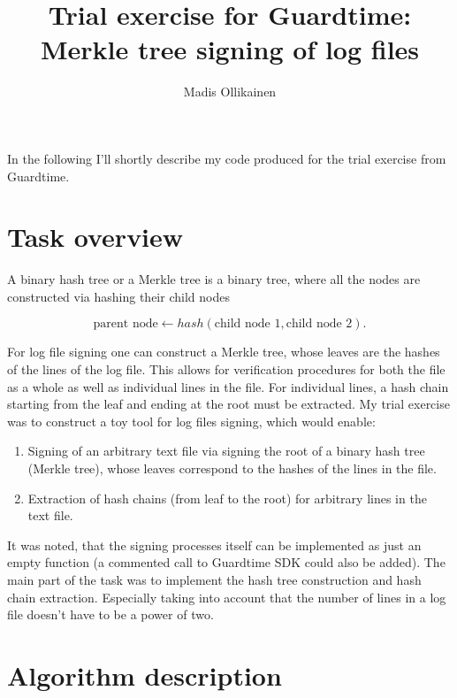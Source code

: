 \documentclass[11pt]{article}
\author{Madis Ollikainen}
\title{Trial exercise for Guardtime: Merkle tree signing of log files}
\begin{document}
\maketitle

In the following I'll shortly describe my code produced for the trial exercise from Guardtime. 

\section{Task overview} %
\label{sec:task_overview}


A binary hash tree or a Merkle tree is a binary tree, where all the nodes are constructed via hashing their child nodes

\begin{equation}
 \text{parent node} \leftarrow hash( \text{child node 1}, \text{child node 2} ). 	
\end{equation} 

For log file signing one can construct a Merkle tree, whose leaves are the hashes of the lines of the log file. This allows for verification procedures for both the file as a whole as well as individual lines in the file. For individual lines, a hash chain starting from the leaf and ending at the root must be extracted. My trial exercise was to construct a toy tool for log files signing, which would enable:  

\begin{enumerate}
  	\item Signing of an arbitrary text file via signing the root of a binary hash tree (Merkle tree), whose leaves correspond to the hashes of the lines in the file.
  	\item Extraction of hash chains (from leaf to the root) for arbitrary lines in the text file.  
\end{enumerate}  

It was noted, that the signing processes itself can be implemented as just an empty function (a commented call to Guardtime SDK could also be added). The main part of the task was to implement the hash tree construction and hash chain extraction. Especially taking into account that the number of lines in a log file doesn't have to be a power of two. 


\section{Algorithm description} %
\label{sec:algorithm_description}
\end{document}
